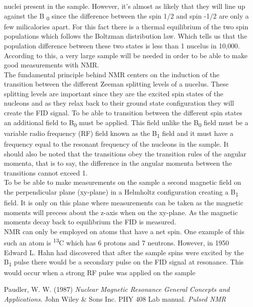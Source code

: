 \documentclass{article}
\begin{document}
{\begin{multicols}{2}
nuclei present in the sample\cite{ref:1}.
However, it's almost as likely that they will line up against the B
\textsubscript{0} since the difference between the spin 1/2 and spin -1/2 are 
only a few milicalories apart. For this fact there is a thermal equilibrium of 
the two spin populations which follows the Boltzman distribution law. Which 
tells us that the population difference between these two states is less than 
1 nucelus in 10,000. According to this, a very large sample will be needed in 
order to be able to make good measurements with NMR\cite{ref:1}.
\\
The fundamental principle behind NMR centers on the induction of the transition 
between the different Zeeman splitting levels of a nucelus. These splitting 
levels are important since they are the excited spin states of the nucleons and 
as they relax back to their ground state configuration they will create the 
FID signal. To be able to transition between the different spin states an 
additional field to B\textsubscript{0} must be applied. This field unlike the 
B\textsubscript{0} field must be a variable radio frequency (RF) field known as 
the B\textsubscript{1} field and it must have a frequency equal to the resonant 
frequency of the nucleons in the sample. It should also be noted that the 
transitions obey the transition rules of the angular momenta, that is to say, 
the difference in the angular momenta between the transitions cannot exceed 1.
\\
To be 
be able to make measurements on the sample a second magnetic field on the 
perpendicular plane (xy-plane) in a Helmholtz configuration creating a 
B\textsubscript{1} field. It is only on this plane where measurements can 
be taken as the magnetic moments will precess about the z-axis when on the 
xy-plane. As the magnetic moments decay back to equilibrium the FID is measured.
\\
NMR can only be employed on atoms that have a net spin. One example of this 
such an atom is \textsuperscript{13}C which has 6 protons and 7 neutrons. 
However, in 1950 Edward L. Hahn had discovered that after the sample spins were 
excited by the B\textsubscript{1} pulse there would be a secondary pulse on the 
FID signal at resonance. This would occur when a strong RF pulse was applied on 
the sample 
\begin{thebibliography}{9}
Paudler, W. W. (1987) \emph{Nuclear Magnetic Resonance General 
Concepts and Applications}. John Wiley \& Sons Inc.
PHY 408 Lab manual. \emph{Pulsed NMR}
\end{thebibliography}
\end{multicols}
}
\end{document}
